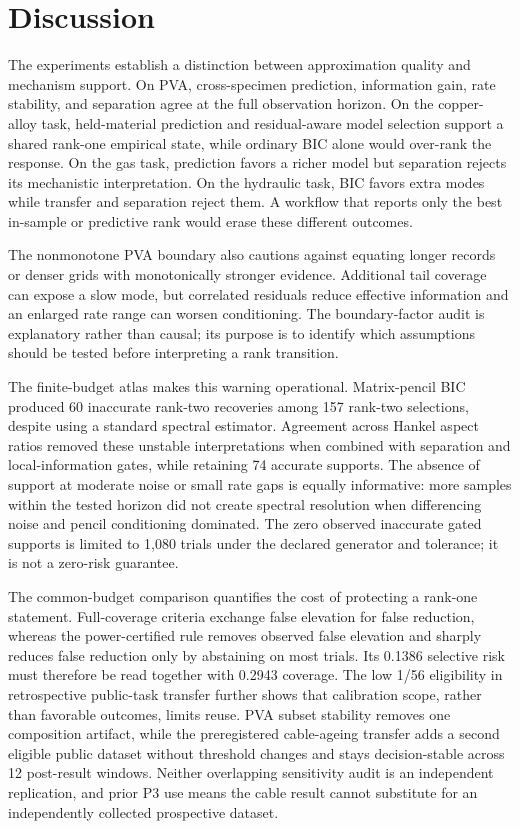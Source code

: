 \documentclass[11pt]{article}
\begin{document}
\section{Discussion}
The experiments establish a distinction between approximation quality and mechanism support. On PVA, cross-specimen prediction, information gain, rate stability, and separation agree at the full observation horizon. On the copper-alloy task, held-material prediction and residual-aware model selection support a shared rank-one empirical state, while ordinary BIC alone would over-rank the response. On the gas task, prediction favors a richer model but separation rejects its mechanistic interpretation. On the hydraulic task, BIC favors extra modes while transfer and separation reject them. A workflow that reports only the best in-sample or predictive rank would erase these different outcomes.

The nonmonotone PVA boundary also cautions against equating longer records or denser grids with monotonically stronger evidence. Additional tail coverage can expose a slow mode, but correlated residuals reduce effective information and an enlarged rate range can worsen conditioning. The boundary-factor audit is explanatory rather than causal; its purpose is to identify which assumptions should be tested before interpreting a rank transition.

The finite-budget atlas makes this warning operational. Matrix-pencil BIC produced 60 inaccurate rank-two recoveries among 157 rank-two selections, despite using a standard spectral estimator. Agreement across Hankel aspect ratios removed these unstable interpretations when combined with separation and local-information gates, while retaining 74 accurate supports. The absence of support at moderate noise or small rate gaps is equally informative: more samples within the tested horizon did not create spectral resolution when differencing noise and pencil conditioning dominated. The zero observed inaccurate gated supports is limited to 1,080 trials under the declared generator and tolerance; it is not a zero-risk guarantee.

The common-budget comparison quantifies the cost of protecting a rank-one statement. Full-coverage criteria exchange false elevation for false reduction, whereas the power-certified rule removes observed false elevation and sharply reduces false reduction only by abstaining on most trials. Its 0.1386 selective risk must therefore be read together with 0.2943 coverage. The low 1/56 eligibility in retrospective public-task transfer further shows that calibration scope, rather than favorable outcomes, limits reuse. PVA subset stability removes one composition artifact, while the preregistered cable-ageing transfer adds a second eligible public dataset without threshold changes and stays decision-stable across 12 post-result windows. Neither overlapping sensitivity audit is an independent replication, and prior P3 use means the cable result cannot substitute for an independently collected prospective dataset.
\end{document}
